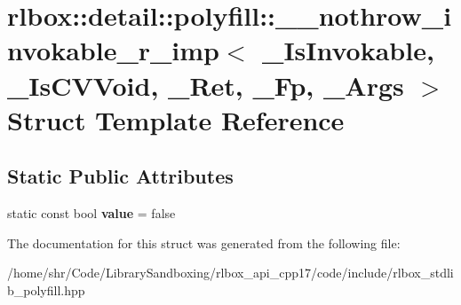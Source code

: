 \hypertarget{structrlbox_1_1detail_1_1polyfill_1_1____nothrow__invokable__r__imp}{}\section{rlbox\+:\+:detail\+:\+:polyfill\+:\+:\+\_\+\+\_\+nothrow\+\_\+invokable\+\_\+r\+\_\+imp$<$ \+\_\+\+Is\+Invokable, \+\_\+\+Is\+C\+V\+Void, \+\_\+\+Ret, \+\_\+\+Fp, \+\_\+\+Args $>$ Struct Template Reference}
\label{structrlbox_1_1detail_1_1polyfill_1_1____nothrow__invokable__r__imp}
\subsection*{Static Public Attributes}
\begin{DoxyCompactItemize}
\item 
\mbox{\label{structrlbox_1_1detail_1_1polyfill_1_1____nothrow__invokable__r__imp_aaa3afbce40cb594321ea054cf5b1bb1e}} 
static const bool {\bfseries value} = false
\end{DoxyCompactItemize}


The documentation for this struct was generated from the following file\+:\begin{DoxyCompactItemize}
\item 
/home/shr/\+Code/\+Library\+Sandboxing/rlbox\+\_\+api\+\_\+cpp17/code/include/rlbox\+\_\+stdlib\+\_\+polyfill.\+hpp\end{DoxyCompactItemize}
